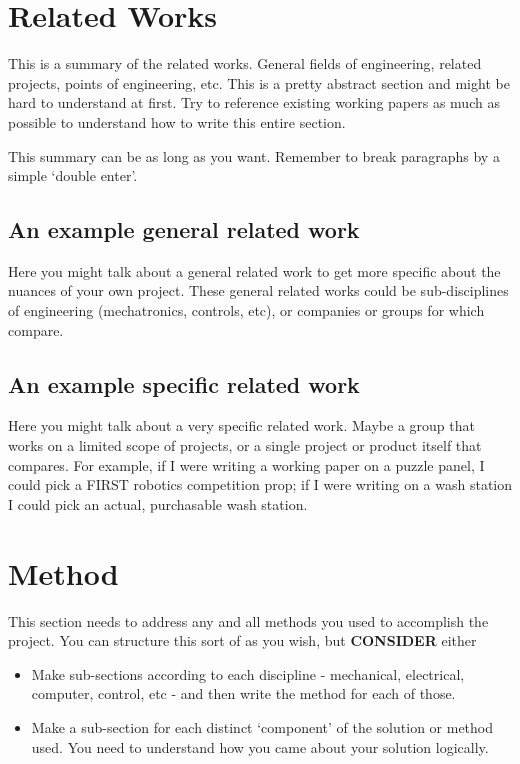 \documentclass[conference]{IEEEtran}
\begin{document}
\section{Related Works}
This is a summary of the related works. General fields of engineering, related projects, points of engineering, etc. This is a pretty abstract section and might be hard to understand at first. Try to reference existing working papers as much as possible to understand how to write this entire section.

This summary can be as long as you want. Remember to break paragraphs by a simple `double enter'.

\subsection{An example general related work}
Here you might talk about a general related work to get more specific about the nuances of your own project.  These general related works could be sub-disciplines of engineering (mechatronics, controls, etc), or companies or groups for which compare.

\subsection{An example specific related  work}
Here you might talk about a very specific related work. Maybe a group that works on a limited scope of projects, or a single project or product itself that compares. For example, if I were writing a working paper on a puzzle panel, I could pick a FIRST robotics competition prop; if I were writing on a wash station I could pick an actual, purchasable wash station.

\section{Method}
This section needs to address any and all methods you used to accomplish the project. You can structure this sort of as you wish, but \textbf{CONSIDER} either

\begin{itemize}
\item Make sub-sections according to each discipline - mechanical, electrical, computer, control, etc - and then write the method for each of those.
\item Make a sub-section for each distinct `component' of the solution or method used. You need to understand how you came about your solution logically.
\end{itemize}
\end{document}
